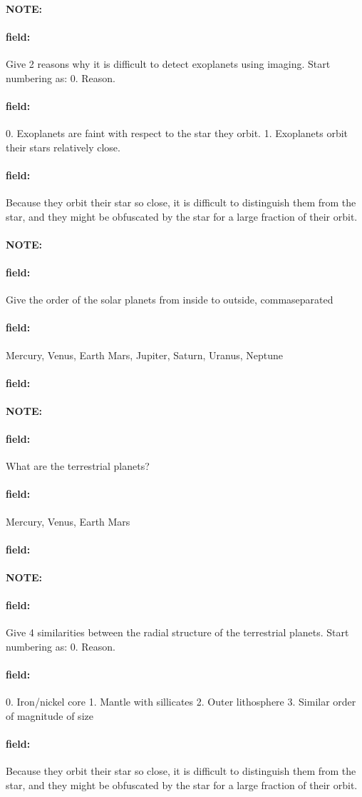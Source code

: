 \documentclass[12pt]{article}
\newenvironment{note}{\paragraph{NOTE:}}{}
\newenvironment{field}{\paragraph{field:}}{}
\begin{document}
\begin{note}
   \begin{field}
       Give 2 reasons why it  is difficult to detect exoplanets using imaging. Start numbering as: 0. Reason.
   \end{field}
   \begin{field}
		0. Exoplanets are faint with respect to the star they orbit.
		1. Exoplanets orbit their stars relatively close.
   \end{field}
   \begin{field}
		Because they orbit their star so close, it is difficult to distinguish them from the star, and they might be obfuscated by the star for a large fraction of their orbit.
   \end{field}
\end{note}
\begin{note}
   \begin{field}
       Give the order of the solar planets from inside to outside, commaseparated
   \end{field}
   \begin{field}
		Mercury, Venus, Earth Mars, Jupiter, Saturn, Uranus, Neptune
   \end{field}
   \begin{field}
   \end{field}
\end{note}
\begin{note}
   \begin{field}
       What are the terrestrial planets?
   \end{field}
   \begin{field}
		Mercury, Venus, Earth Mars
   \end{field}
   \begin{field}
   \end{field}
\end{note}
\begin{note}
   \begin{field}
       Give 4 similarities between the radial structure of the terrestrial planets. Start numbering as: 0. Reason.
   \end{field}
   \begin{field}
		0. Iron/nickel core
		1. Mantle with sillicates
		2. Outer lithosphere
		3. Similar order of magnitude of size
   \end{field}
   \begin{field}
		Because they orbit their star so close, it is difficult to distinguish them from the star, and they might be obfuscated by the star for a large fraction of their orbit.
   \end{field}
\end{note}
\end{document}
